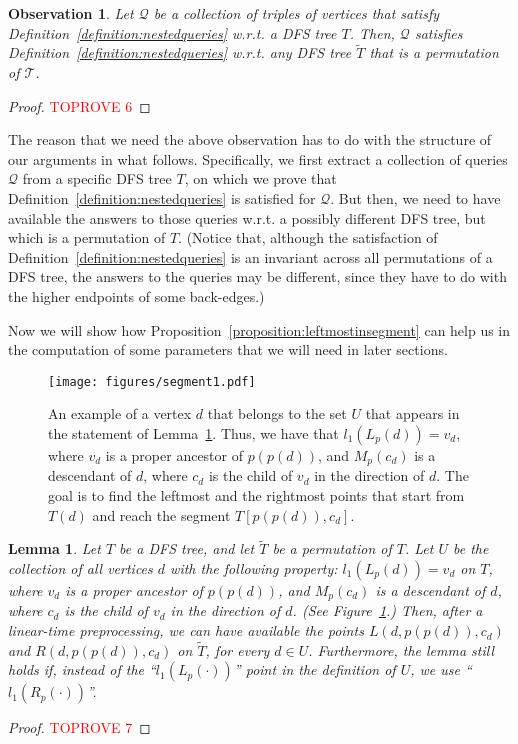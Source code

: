 \documentclass[11pt,a4paper]{article}
\newtheorem{lemma}[theorem]{Lemma}
\newtheorem{observation}[theorem]{Observation}
\begin{document}
\begin{observation}
\label{observation:nestedqueries}
Let $\mathcal{Q}$ be a collection of triples of vertices that satisfy Definition~\ref{definition:nestedqueries} w.r.t. a DFS tree $T$. Then, $\mathcal{Q}$ satisfies Definition~\ref{definition:nestedqueries} w.r.t. any DFS tree $\widetilde{T}$ that is a permutation of $\mathcal{T}$.
\end{observation}
\begin{proof}\textcolor{red}{TOPROVE 6}\end{proof}

The reason that we need the above observation has to do with the structure of our arguments in what follows. Specifically, we first extract a collection of queries $\mathcal{Q}$ from a specific DFS tree $T$, on which we prove that Definition~\ref{definition:nestedqueries} is satisfied for $\mathcal{Q}$. But then, we need to have available the answers to those queries w.r.t. a possibly different DFS tree, but which is a permutation of $T$. (Notice that, although the satisfaction of Definition~\ref{definition:nestedqueries} is an invariant across all permutations of a DFS tree, the answers to the queries may be different, since they have to do with the higher endpoints of some back-edges.)

Now we will show how Proposition~\ref{proposition:leftmostinsegment} can help us in the computation of some parameters that we will need in later sections.

\begin{figure}[h!]\centering
\texttt{[image: figures/segment1.pdf]}
\caption{\small{An example of a vertex $d$ that belongs to the set $U$ that appears in the statement of Lemma~\ref{lemma:segmentpointsL}. Thus, we have that $l_1(L_p(d))=v_d$, where $v_d$ is a proper ancestor of $p(p(d))$, and $M_p(c_d)$ is a descendant of $d$, where $c_d$ is the child of $v_d$ in the direction of $d$. The goal is to find the leftmost and the rightmost points that start from $T(d)$ and reach the segment $T[p(p(d)),c_d]$.}}\label{figure:segment1}
\end{figure}


\begin{lemma}
\label{lemma:segmentpointsL}
Let $T$ be a DFS tree, and let $\widetilde{T}$ be a permutation of $T$. Let $U$ be the collection of all vertices $d$ with the following property: $l_1(L_p(d))=v_d$ on $T$, where $v_d$ is a proper ancestor of $p(p(d))$, and $M_p(c_d)$ is a descendant of $d$, where $c_d$ is the child of $v_d$ in the direction of $d$. (See Figure~\ref{figure:segment1}.) Then, after a linear-time preprocessing, we can have available the points $L(d,p(p(d)),c_d)$ and $R(d,p(p(d)),c_d)$ on $\widetilde{T}$, for every $d\in U$. Furthermore, the lemma still holds if, instead of the ``$l_1(L_p(\cdot))$'' point in the definition of $U$, we use ``$l_1(R_p(\cdot))$''. 
\end{lemma}
\begin{proof}\textcolor{red}{TOPROVE 7}\end{proof}
\end{document}
